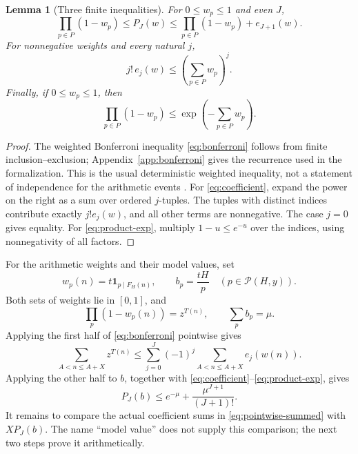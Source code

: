 \documentclass[11pt,a4paper]{article}
\newtheorem{lemma}[theorem]{Lemma}
\theoremstyle{definition}
\theoremstyle{remark}
\numberwithin{equation}{section}
\newcommand{\Pset}{\mathcal P}
\newcommand{\ind}{\mathbf 1}
\begin{document}
\begin{lemma}[Three finite inequalities]\label{lem:bonferroni}
For $0\le w_p\le1$ and even $J$,
\begin{equation}\label{eq:bonferroni}
 \prod_{p\in P}(1-w_p)\le P_J(w)
 \le\prod_{p\in P}(1-w_p)+e_{J+1}(w).
\end{equation}
For nonnegative weights and every natural $j$,
\begin{equation}\label{eq:coefficient}
 j!\,e_j(w)\le\left(\sum_{p\in P}w_p\right)^j.
\end{equation}
Finally, if $0\le w_p\le1$, then
\begin{equation}\label{eq:product-exp}
 \prod_{p\in P}(1-w_p)\le\exp\!\left(-\sum_{p\in P}w_p\right).
\end{equation}
\end{lemma}
\begin{proof}
The weighted Bonferroni inequality \eqref{eq:bonferroni} follows from finite
inclusion--exclusion; Appendix~\ref{app:bonferroni} gives the recurrence used in
the formalization. This is the usual deterministic weighted inequality, not a
statement of independence for the arithmetic events \citep{GalambosSimonelli1996}.
For \eqref{eq:coefficient}, expand the power on the right as a sum over ordered
$j$-tuples. The tuples with distinct indices contribute exactly $j!e_j(w)$,
and all other terms are nonnegative. The case $j=0$ gives equality.
For \eqref{eq:product-exp}, multiply $1-u\le e^{-u}$ over the indices, using
nonnegativity of all factors.
\end{proof}
For the arithmetic weights and their model values, set
\begin{equation}\label{eq:weights}
 w_p(n)=t\ind_{p\mid F_H(n)},\qquad b_p=\frac{tH}{p}
 \quad(p\in\Pset(H,y)).
\end{equation}
Both sets of weights lie in $[0,1]$, and
\begin{equation}\label{eq:weight-products}
 \prod_p(1-w_p(n))=z^{T(n)},\qquad \sum_p b_p=\mu.
\end{equation}
Applying the first half of \eqref{eq:bonferroni} pointwise gives
\begin{equation}\label{eq:pointwise-summed}
 \sum_{A<n\le A+X}z^{T(n)}
 \le\sum_{j=0}^J(-1)^j\sum_{A<n\le A+X}e_j(w(n)).
\end{equation}
Applying the other half to $b$, together with
\eqref{eq:coefficient}--\eqref{eq:product-exp}, gives
\begin{equation}\label{eq:mean-truncation}
 P_J(b)\le e^{-\mu}+\frac{\mu^{J+1}}{(J+1)!}.
\end{equation}
It remains to compare the actual coefficient sums in
\eqref{eq:pointwise-summed} with $XP_J(b)$. The name ``model value'' does not
supply this comparison; the next two steps prove it arithmetically.
\end{document}
